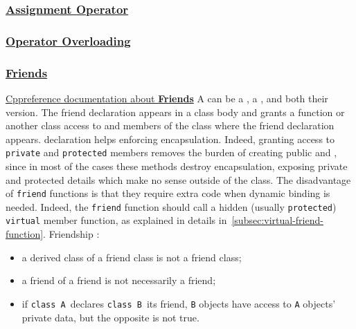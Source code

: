 \subsubsection{\href{https://isocpp.org/wiki/faq/assignment-operators}{\textbf{Assignment Operator}}}

\subsubsection{\href{https://isocpp.org/wiki/faq/operator-overloading}{\textbf{Operator Overloading}}}

\subsubsection{\href{https://isocpp.org/wiki/faq/friends}{\textbf{Friends}}}
\label{subsubsec:friend}
\href{https://en.cppreference.com/w/cpp/language/friend}{Cppreference documentation about \textbf{Friends}}
\newline
A  can be a , a , 
and both their  version.
\newline
The friend declaration appears in a class body and grants a function or 
another class access to  and  
members of the class where the friend declaration appears. 
\newline
{} declaration helps enforcing encapsulation. Indeed, 
granting access to \texttt{private} and \texttt{protected} members 
removes the burden of creating public  and 
, since in most of the cases these methods destroy 
encapsulation, exposing private and protected details which make no 
sense outside of the class.
\newline
The disadvantage of \texttt{friend} functions is that they require 
extra code when dynamic binding is needed. Indeed, the \texttt{friend} 
function should call a hidden (usually \texttt{protected}) \texttt{virtual} 
member function, as explained in details in~\ref{subsec:virtual-friend-function}.
\newline
Friendship :
\begin{itemize}
    \item a derived class of a friend class is not a friend class;
    \item a friend of a friend is not necessarily a friend;
    \item if \texttt{class A}\, declares \texttt{class B}\, its friend, 
    \texttt{B} objects have access to \texttt{A} objects' private data, 
    but the opposite is not true. 
\end{itemize}

